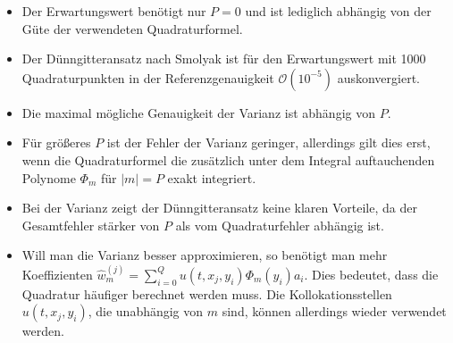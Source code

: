 \begin{itemize}
\item Der Erwartungswert benötigt nur $P=0$ und ist lediglich abhängig von der Güte der verwendeten Quadraturformel.
\item Der Dünngitteransatz nach Smolyak ist für den Erwartungswert mit 1000 Quadraturpunkten in der Referenzgenauigkeit $\mathcal{O}(10^{-5})$ auskonvergiert.
\item Die maximal mögliche Genauigkeit der Varianz ist abhängig von $P$. 
\item Für größeres $P$ ist der Fehler der Varianz geringer, allerdings gilt dies erst, wenn die Quadraturformel die zusätzlich unter dem Integral auftauchenden Polynome $\Phi_m$ für $|m|=P$ exakt integriert.
\item Bei der Varianz zeigt der Dünngitteransatz keine klaren Vorteile, da der Gesamtfehler stärker von $P$ als vom Quadraturfehler abhängig ist.
\item Will man die Varianz besser approximieren, so benötigt man mehr Koeffizienten $\hat{w}_m^{(j)}=\sum_{i=0}^Qu(t,x_j,y_i)\Phi_m(y_i)a_i$. Dies bedeutet, dass die Quadratur häufiger berechnet werden muss. Die Kollokationsstellen $u(t,x_j,y_i)$, die unabhängig von $m$ sind, können allerdings wieder verwendet werden.
\end{itemize} 


